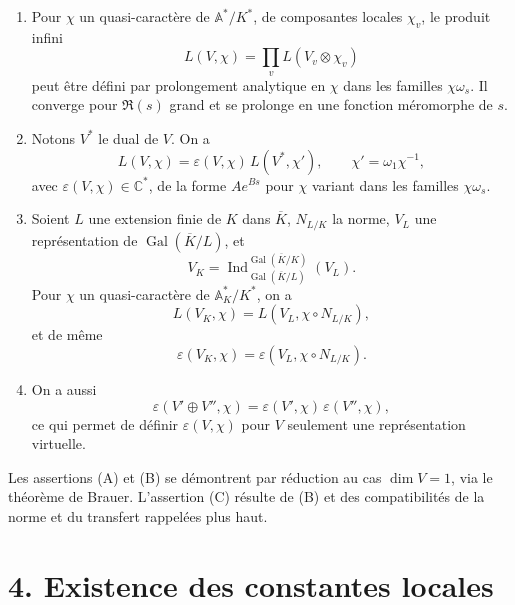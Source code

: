 \documentclass[10pt]{article}
\newcommand{\C}{\mathbb C}
\newcommand{\Gal}{\operatorname{Gal}}
\newcommand{\Ind}{\operatorname{Ind}}
\providecommand{\Gal}{\operatorname{Gal}}
\providecommand{\Gal}{\operatorname{Gal}}
\providecommand{\Gal}{\operatorname{Gal}}
\providecommand{\Gal}{\operatorname{Gal}}
\providecommand{\Ind}{\operatorname{Ind}}
\begin{document}
\begin{enumerate}[label=(\Alph*)]
\item Pour \(\chi\) un quasi-caractère de \(\mathbb A^*/K^*\), de composantes locales \(\chi_v\), le produit infini
\[
L(V,\chi)=\prod_v L(V_v\otimes\chi_v)
\]
peut être défini par prolongement analytique en \(\chi\) dans les familles \(\chi\omega_s\). Il converge pour \(\Re(s)\) grand et se prolonge en une fonction méromorphe de \(s\).

\item Notons \(V^*\) le dual de \(V\). On a
\[
L(V,\chi)=\varepsilon(V,\chi)\,L(V^*,\chi'),
\qquad \chi'=\omega_1\chi^{-1},
\]
avec \(\varepsilon(V,\chi)\in\C^*\), de la forme \(Ae^{Bs}\) pour \(\chi\) variant dans les familles \(\chi\omega_s\).

\item Soient \(L\) une extension finie de \(K\) dans \(\overline K\), \(N_{L/K}\) la norme, \(V_L\) une représentation de \(\Gal(\overline K/L)\), et
\[
V_K=\Ind_{\Gal(\overline K/L)}^{\Gal(\overline K/K)}(V_L).
\]
Pour \(\chi\) un quasi-caractère de \(\mathbb A_K^*/K^*\), on a
\[
L(V_K,\chi)=L(V_L,\chi\circ N_{L/K}),
\]
et de même
\[
\varepsilon(V_K,\chi)=\varepsilon(V_L,\chi\circ N_{L/K}).
\]
\item On a aussi
\[
\varepsilon(V'\oplus V'',\chi)=\varepsilon(V',\chi)\,\varepsilon(V'',\chi),
\]
ce qui permet de définir \(\varepsilon(V,\chi)\) pour \(V\) seulement une représentation virtuelle.
\end{enumerate}
Les assertions (A) et (B) se démontrent par réduction au cas \(\dim V=1\), via le théorème de Brauer. L'assertion (C) résulte de (B) et des compatibilités de la norme et du transfert rappelées plus haut.


\newpage

\section*{4. Existence des constantes locales}
\end{document}
